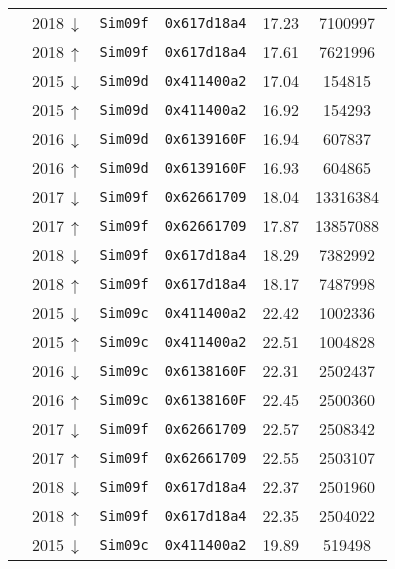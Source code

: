\begin{table}[htbp]
\begin{tabular}{llllS[separate-uncertainty=false]S[table-format=8.0]}
        & 2018\,$\downarrow$ & \texttt{Sim09f} & \texttt{0x617d18a4} & 17.23  & 7100997 \\
        & 2018\,$\uparrow$ & \texttt{Sim09f} & \texttt{0x617d18a4} & 17.61  & 7621996 \\
        \midrule
        \decay{\Lb}{\Dz\proton\Km} & 2015\,$\downarrow$ & \texttt{Sim09d} & \texttt{0x411400a2} & 17.04  & 154815 \\
        & 2015\,$\uparrow$ & \texttt{Sim09d} & \texttt{0x411400a2} & 16.92  & 154293 \\
        & 2016\,$\downarrow$ & \texttt{Sim09d} & \texttt{0x6139160F} & 16.94  & 607837 \\
        & 2016\,$\uparrow$ & \texttt{Sim09d} & \texttt{0x6139160F} & 16.93  & 604865 \\
        & 2017\,$\downarrow$ & \texttt{Sim09f} & \texttt{0x62661709} & 18.04  & 13316384 \\
        & 2017\,$\uparrow$ & \texttt{Sim09f} & \texttt{0x62661709} & 17.87  & 13857088 \\
        & 2018\,$\downarrow$ & \texttt{Sim09f} & \texttt{0x617d18a4} & 18.29  & 7382992 \\
        & 2018\,$\uparrow$ & \texttt{Sim09f} & \texttt{0x617d18a4} & 18.17  & 7487998 \\
        \midrule
        \decay{\Lb}{\Lz\Kp\Km} & 2015\,$\downarrow$ & \texttt{Sim09c} & \texttt{0x411400a2} & 22.42  & 1002336 \\
        & 2015\,$\uparrow$ & \texttt{Sim09c} & \texttt{0x411400a2} & 22.51  & 1004828 \\
        & 2016\,$\downarrow$ & \texttt{Sim09c} & \texttt{0x6138160F} & 22.31  & 2502437 \\
        & 2016\,$\uparrow$ & \texttt{Sim09c} & \texttt{0x6138160F} & 22.45  & 2500360 \\
        & 2017\,$\downarrow$ & \texttt{Sim09f} & \texttt{0x62661709} & 22.57  & 2508342 \\
        & 2017\,$\uparrow$ & \texttt{Sim09f} & \texttt{0x62661709} & 22.55  & 2503107 \\
        & 2018\,$\downarrow$ & \texttt{Sim09f} & \texttt{0x617d18a4} & 22.37  & 2501960 \\
        & 2018\,$\uparrow$ & \texttt{Sim09f} & \texttt{0x617d18a4} & 22.35  & 2504022 \\
        \midrule
        \decay{\Lb}{\jpsi\Lz} & 2015\,$\downarrow$ & \texttt{Sim09c} & \texttt{0x411400a2} & 19.89  & 519498 \\

\end{tabular}
\end{table}
